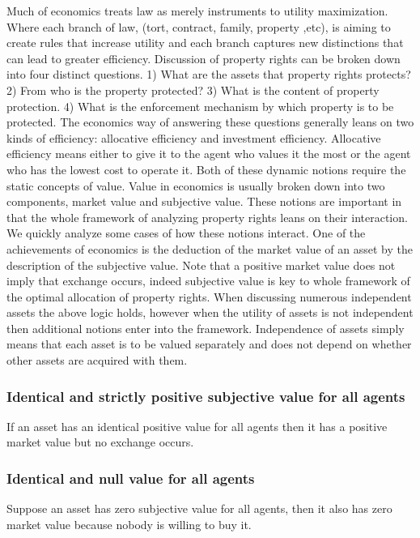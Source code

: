 \documentclass[12pt]{article}
\numberwithin{equation}{section}
\begin{document}
Much of economics treats law as merely instruments to utility maximization. Where each branch of law, (tort, contract, family, property ,etc), is aiming to create rules that increase utility and each branch captures new distinctions that can lead to greater efficiency. Discussion of property rights can be broken down into four distinct questions. 1) What are the assets that property rights protects? 2) From who is the property protected? 3) What is the content of property protection. 4) What is the enforcement mechanism by which property is to be protected. The economics way of answering these questions generally leans on two kinds of efficiency: allocative efficiency and investment efficiency. Allocative efficiency means either to give it to the agent who values it the most or the agent who has the lowest cost to operate it. Both of these dynamic notions require the static concepts of value. Value in economics is usually broken down into two components, market value and subjective value. These notions are important in that the whole framework of analyzing property rights leans on their interaction. We quickly analyze some cases of how these notions interact. One of the achievements of economics is the deduction of the market value of an asset by the description of the subjective value. Note that a positive market value does not imply that exchange occurs, indeed subjective value is key to whole framework of the optimal allocation of property rights. When discussing numerous independent assets the above logic holds, however when the utility of assets is not independent then additional notions enter into the framework. Independence of assets simply means that each asset is to be valued separately and does not depend on whether other assets are acquired with them. 


\subsubsection{Identical and strictly positive subjective value for all agents}

If an asset has an identical positive value for all agents then it has a positive market value but no exchange occurs. 

\subsubsection{Identical and null value for all agents}

Suppose an asset has zero subjective value for all agents, then it also has zero market value because nobody is willing to buy it. 
\end{document}
